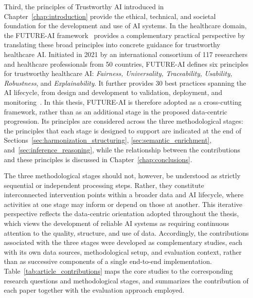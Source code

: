 Third, the principles of Trustworthy AI introduced in Chapter~\ref{chap:introduction} provide the ethical, technical, and societal foundation for the development and use of AI systems. In the healthcare domain, the FUTURE-AI framework~\cite{lekadir_future-ai_2025} provides a complementary practical perspective by translating these broad principles into concrete guidance for trustworthy healthcare AI. Initiated in 2021 by an international consortium of 117 researchers and healthcare professionals from 50 countries, FUTURE-AI defines six principles for trustworthy healthcare AI: \emph{Fairness, Universality, Traceability, Usability, Robustness}, and \emph{Explainability}. It further provides 30 best practices spanning the AI lifecycle, from design and development to validation, deployment, and monitoring~\cite{lekadir_future-ai_2025}. In this thesis, FUTURE-AI is therefore adopted as a cross-cutting framework, rather than as an additional stage in the proposed data-centric progression. Its principles are considered across the three methodological stages: the principles that each stage is designed to support are indicated at the end of Sections~\ref{sec:harmonization_structuring}, \ref{sec:semantic_enrichment}, and~\ref{sec:inference_reasoning}, while the relationship between the contributions and these principles is discussed in Chapter~\ref{chap:conclusions}.

The three methodological stages should not, however, be understood as strictly sequential or independent processing steps. Rather, they constitute interconnected intervention points within a broader data and AI lifecycle, where activities at one stage may inform or depend on those at another. This iterative perspective reflects the data-centric orientation adopted throughout the thesis, which views the development of reliable AI systems as requiring continuous attention to the quality, structure, and use of data. Accordingly, the contributions associated with the three stages were developed as complementary studies, each with its own data sources, methodological setup, and evaluation context, rather than as successive components of a single end-to-end implementation. Table~\ref{tab:article_contributions} maps the core studies to the corresponding research questions and methodological stages, and summarizes the contribution of each paper together with the evaluation approach employed.


